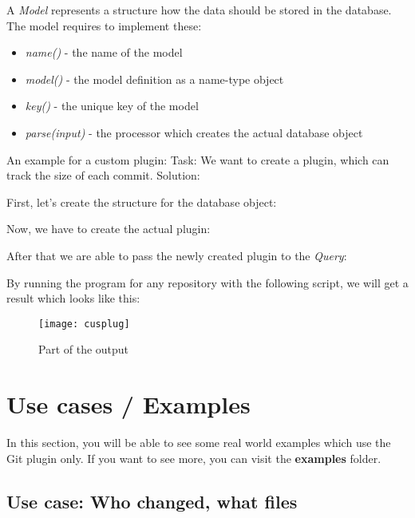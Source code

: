 A \textit{Model} represents a structure how the data should be stored in the database.
The model requires to implement these:
\begin{itemize}
	\item \textit{name()} - the name of the model
	\item \textit{model()} - the model definition as a name-type object 
	\item \textit{key()} - the unique key of the model
	\item \textit{parse(input)} - the processor which creates the actual database object
\end{itemize}

An example for a custom plugin:\newline
Task: We want to create a plugin, which can track the size of each commit. 
Solution:\newline

First, let's create the structure for the database object:


Now, we have to create the actual plugin:


After that we are able to pass the newly created plugin to the \textit{Query}:


By running the program for any repository with the following script, we will get a result which looks like this:




\begin{figure}[H]
	\centering
	\texttt{[image: cusplug]}
	\caption{Part of the output}
	\label{fig:fig-cusplug}
\end{figure}


\section{Use cases / Examples}

In this section, you will be able to see some real world examples which use the Git plugin only.
If you want to see more, you can visit the \textbf{examples} folder.

\subsection{Use case: Who changed, what files}

